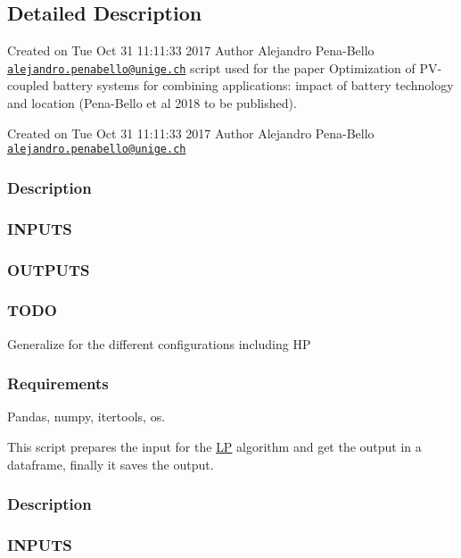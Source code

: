 \subsection{Detailed Description}
Created on Tue Oct 31 11\+:11\+:33 2017 Author Alejandro Pena-\/\+Bello \href{mailto:alejandro.penabello@unige.ch}{\tt alejandro.\+penabello@unige.\+ch} script used for the paper Optimization of P\+V-\/coupled battery systems for combining applications\+: impact of battery technology and location (Pena-\/\+Bello et al 2018 to be published). 

Created on Tue Oct 31 11\+:11\+:33 2017 Author Alejandro Pena-\/\+Bello \href{mailto:alejandro.penabello@unige.ch}{\tt alejandro.\+penabello@unige.\+ch} \subsubsection*{Description }

\subsubsection*{I\+N\+P\+U\+TS }

\subsubsection*{O\+U\+T\+P\+U\+TS }

\subsubsection*{T\+O\+DO }

Generalize for the different configurations including HP \subsubsection*{Requirements }

Pandas, numpy, itertools, os.

This script prepares the input for the \mbox{\hyperlink{namespace_l_p}{LP}} algorithm and get the output in a dataframe, finally it saves the output. \subsubsection*{Description }

\subsubsection*{I\+N\+P\+U\+TS }

